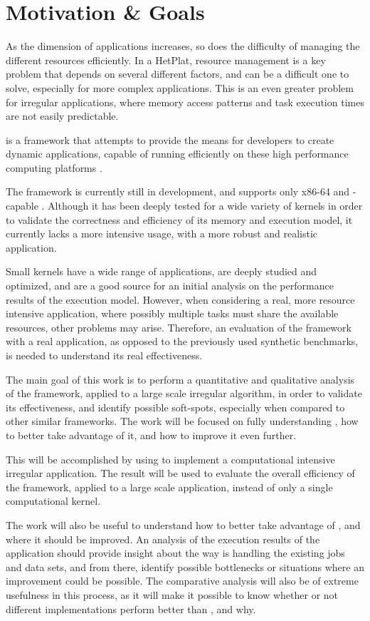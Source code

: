 \documentclass[main.tex]{subfiles}
\begin{document}
\section{Motivation \& Goals}


As the dimension of applications increases, so does the difficulty of managing the different resources efficiently. In a \ac{HetPlat}, resource management is a key problem that depends on several different factors, and can be a difficult one to solve, especially for more complex applications. This is an even greater problem for irregular applications, where memory access patterns and task execution times are not easily predictable.

\gama is a framework that attempts to provide the means for developers to create dynamic applications, capable of running efficiently on these high performance computing platforms \cite{joao2012gama}.

The \gama framework is currently still in development, and supports only x86-64 \cpus and \cuda-capable \gpus. Although it has been deeply tested for a wide variety of kernels in order to validate the correctness and efficiency of its memory and execution model, it currently lacks a more intensive usage, with a more robust and realistic application.

Small kernels have a wide range of applications, are deeply studied and optimized, and are a good source for an initial analysis on the performance results of the execution model. However, when considering a real, more resource intensive application, where possibly multiple tasks must share the available resources, other problems may arise. Therefore, an evaluation of the framework with a real application, as opposed to the previously used synthetic benchmarks, is needed to understand its real effectiveness.

The main goal of this work is to perform a quantitative and qualitative analysis of the \gama framework, applied to a large scale irregular algorithm, in order to validate its effectiveness, and identify possible soft-spots, especially when compared to other similar frameworks. The work will be focused on fully understanding \gama, how to better take advantage of it, and how to improve it even further.

This will be accomplished by using \gama to implement a computational intensive irregular application. The result will be used to evaluate the overall efficiency of the \gama framework, applied to a large scale application, instead of only a single computational kernel.

The work will also be useful to understand how to better take advantage of \gama, and where it should be improved. An analysis of the execution results of the application should provide insight about the way \gama is handling the existing jobs and data sets, and from there, identify possible bottlenecks or situations where an improvement could be possible. The comparative analysis will also be of extreme usefulness in this process, as it will make it possible to know whether or not different implementations perform better than \gama, and why.
\end{document}
